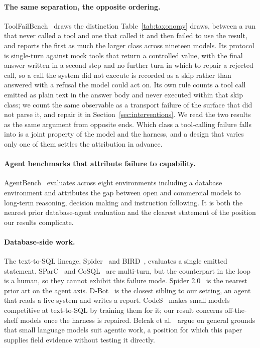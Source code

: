 \documentclass[11pt]{article}
\begin{document}
\paragraph{The same separation, the opposite ordering.}
ToolFailBench~\cite{soni2026toolfailbench} draws the distinction Table~\ref{tab:taxonomy} draws, between a run
that never called a tool and one that called it and then failed to use the result, and reports the first as much
the larger class across nineteen models. Its protocol is single-turn against mock tools that return a controlled
value, with the final answer written in a second step and no further turn in which to repair a rejected call, so
a call the system did not execute is recorded as a skip rather than answered with a refusal the model could act
on. Its own rule counts a tool call emitted as plain text in the answer body and never executed within that skip
class; we count the same observable as a transport failure of the surface that did not parse it, and repair it in
Section~\ref{sec:interventions}. We read the two results as the same argument from opposite ends. Which class a
tool-calling failure falls into is a joint property of the model and the harness, and a design that varies only
one of them settles the attribution in advance.

\paragraph{Agent benchmarks that attribute failure to capability.}
AgentBench~\cite{liu2024agentbench} evaluates across eight environments including a database environment and
attributes the gap between open and commercial models to long-term reasoning, decision making and instruction
following. It is both the nearest prior database-agent evaluation and the clearest statement of the position our
results complicate.

\paragraph{Database-side work.}
The text-to-SQL lineage, Spider~\cite{yu2018spider} and BIRD~\cite{li2023bird}, evaluates a single emitted
statement. SParC~\cite{yu2019sparc} and CoSQL~\cite{yu2019cosql} are multi-turn, but the counterpart in the loop
is a human, so they cannot exhibit this failure mode. Spider 2.0~\cite{lei2025spider2} is the nearest prior art
on the agent axis. D-Bot~\cite{zhou2024dbot} is the closest sibling to our setting, an agent that reads a live
system and writes a report. CodeS~\cite{li2024codes} makes small models competitive at text-to-SQL by training
them for it; our result concerns off-the-shelf models once the harness is repaired. Belcak et
al.~\cite{belcak2025slm} argue on general grounds that small language models suit agentic work, a position for
which this paper supplies field evidence without testing it directly.
\end{document}
